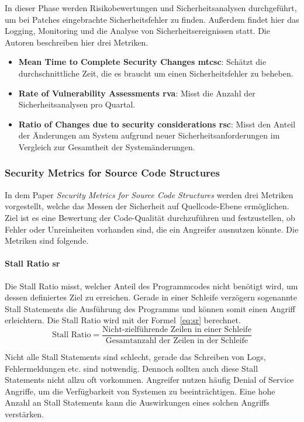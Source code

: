 \documentclass[12pt, a4paper, ngerman]{article}
\begin{document}
In dieser Phase werden Risikobewertungen und Sicherheitsanalysen durchgeführt, um bei Patches eingebrachte Sicherheitsfehler zu finden.
Außerdem findet hier das Logging, Monitoring und die Analyse von Sicherheitsereignissen statt.
Die Autoren beschreiben hier drei Metriken.
\begin{itemize}
  \item \textbf{Mean Time to Complete Security Changes \acs{mtcsc}}: Schätzt die durchschnittliche Zeit, die es braucht um einen Sicherheitsfehler zu beheben. 
  \item \textbf{Rate of Vulnerability Assessments \acs{rva}}: Misst die Anzahl der Sicherheitsanalysen pro Quartal.
  \item \textbf{Ratio of Changes due to security considerations \acs{rsc}}: Misst den Anteil der Änderungen am System aufgrund neuer Sicherheitsanforderungen im Vergleich zur Gesamtheit der Systemänderungen.
\end{itemize}

\subsubsection{Security Metrics for Source Code Structures~\cite{Chowdhury_Chan_Zulkernine_2008}}

In dem Paper \emph{Security Metrics for Source Code Structures} werden drei Metriken vorgestellt, 
welche das Messen der Sicherheit auf Quellcode-Ebene ermöglichen.
Ziel ist es eine Bewertung der Code-Qualität durchzuführen und 
festzustellen, ob Fehler oder Unreinheiten vorhanden sind, die ein Angreifer ausnutzen könnte.
Die Metriken sind folgende.

\paragraph{Stall Ratio \acs{sr}}

Die Stall Ratio misst, welcher Anteil des Programmcodes nicht benötigt wird, um dessen definiertes Ziel zu erreichen.
Gerade in einer Schleife verzögern sogenannte Stall Statements die Ausführung des Programms und können somit einen Angriff erleichtern.
Die Stall Ratio wird mit der Formel~\ref{eq:sr} berechnet.
\begin{equation} \label{eq:sr}
  \text{Stall Ratio} = \frac{ \text{Nicht-zielführende Zeilen in einer Schleife} }{ \text{Gesamtanzahl der Zeilen in der Schleife} }
\end{equation}

Nicht alle Stall Statements sind schlecht, gerade das Schreiben von Logs, Fehlermeldungen etc. sind notwendig.
Dennoch sollten auch diese Stall Statements nicht allzu oft vorkommen.
Angreifer nutzen häufig Denial of Service Angriffe, um die Verfügbarkeit von Systemen zu beeinträchtigen.
Eine hohe Anzahl an Stall Statements kann die Auswirkungen eines solchen Angriffs verstärken.
\end{document}
